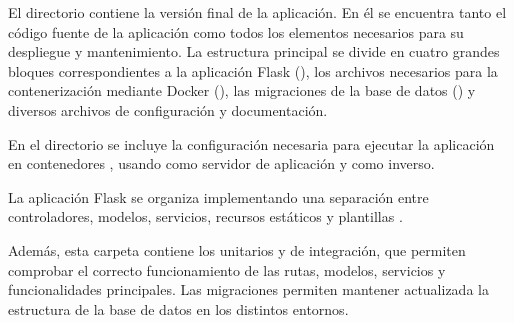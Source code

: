 El directorio  contiene la versión final de la aplicación. En él se encuentra tanto el código fuente de la aplicación como todos los elementos necesarios para su despliegue y mantenimiento. La estructura principal se divide en cuatro grandes bloques correspondientes a la aplicación Flask (), los archivos necesarios para la contenerización mediante Docker (), las migraciones de la base de datos () y diversos archivos de configuración y documentación.

\vspace{0.5cm} 
{\footnotesize
{}}

En el directorio  se incluye la configuración necesaria para ejecutar la aplicación en contenedores , usando  como servidor de aplicación y  como  inverso.

\vspace{0.5cm} 
{\footnotesize
{}}
\vspace{0.2cm}

La aplicación Flask se organiza implementando una separación entre controladores, modelos, servicios, recursos estáticos y plantillas . 

Además, esta carpeta contiene los  unitarios y de integración, que permiten comprobar el correcto funcionamiento de las rutas, modelos, servicios y funcionalidades principales. Las migraciones permiten mantener actualizada la estructura de la base de datos en los distintos entornos.

